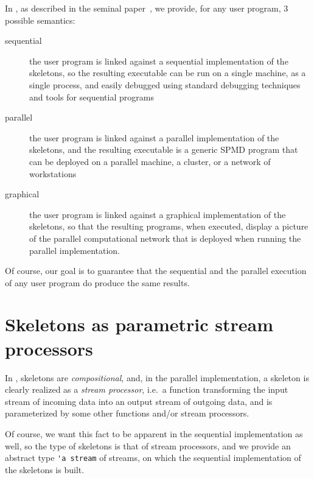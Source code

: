 In \ocamlpiiil, as described in the seminal paper~\cite{Ocamlp3lMlw98},
we provide, for any user program, 3 possible semantics: 
\begin{description}
  \item[sequential] the user program is linked against a sequential implementation
                    of the skeletons, so the resulting executable can be run on
                    a single machine, as a single process, and easily debugged using
                    standard debugging techniques and tools for sequential programs
  \item[parallel]  the user program is linked against a parallel implementation
                   of the skeletons, and the resulting executable is a generic
                   SPMD program that can be deployed on a parallel machine, a cluster,
                   or a network of workstations
  \item[graphical] the user program is linked against a graphical implementation of
                   the skeletons, so that the resulting programs, when executed, 
                   display a picture of the parallel computational network that is
                   deployed when running the parallel implementation.
\end{description}
Of course, our goal is to guarantee that the sequential and the parallel execution of
any user program do produce the same results.

\section{Skeletons as parametric stream processors}

In \ocamlpiiil, skeletons are \emph{compositional}, and, in the parallel implementation, 
a  skeleton is clearly realized as a \emph{stream processor},
i.e.\  a function transforming the input stream of incoming data into an output stream of
outgoing data, and is parameterized by some other functions and/or stream processors.

Of course, we want this fact to be apparent in the sequential implementation as well,
so the type of skeletons is that of stream processors, and we provide an abstract type
\verb|'a stream| of streams, on which the sequential implementation of the skeletons is
built.

